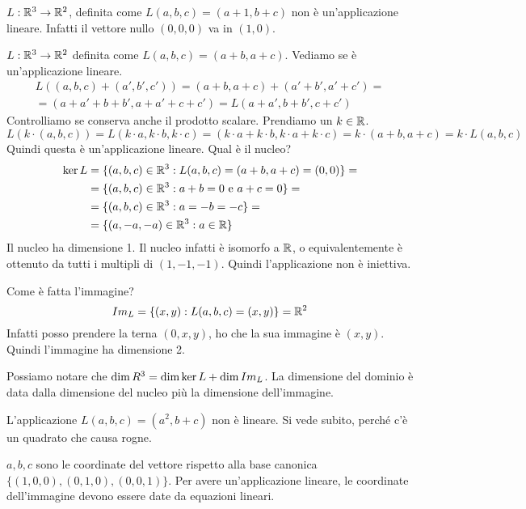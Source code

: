 \begin{exmp}
$L : \mathbb{R}^3 \to \mathbb{R}^2$, definita come $L(a,b,c) = (a+1, b+c)$ non \`e un'applicazione lineare. Infatti il vettore nullo $(0,0,0)$ va in $(1,0)$.

$L: \mathbb{R}^3 \to \mathbb{R}^2$ definita come $L(a,b,c) = (a + b, a + c)$. Vediamo se \`e un'applicazione lineare.
\begin{align*}
L \left( (a,b,c) + (a',b',c') \right) = (a+b,a+c) + (a' + b', a' + c') = \\ = (a + a' + b + b', a + a' + c + c') = L \left( a + a', b + b', c + c' \right)
\end{align*}
Controlliamo se conserva anche il prodotto scalare. Prendiamo un $k \in \mathbb{R}$.
\[
L \left( k \cdot (a,b,c) \right) = L \left( k \cdot a, k \cdot b, k \cdot c \right) = (k \cdot a + k \cdot b, k \cdot a + k \cdot c) = k \cdot (a + b, a + c) = k \cdot L(a, b, c)
\]
Quindi questa \`e un'applicazione lineare. Qual \`e il nucleo?
\begin{align*}
\ker L &= \{ (a,b,c) \in \mathbb{R}^3 : L(a,b,c) = (a + b, a +c) = (0, 0)\} = \\
&= \{ (a, b, c) \in \mathbb{R}^3 : a + b = 0 \text{ e } a + c = 0 \} = \\ 
&= \{ (a,b,c) \in \mathbb{R}^3 : a = -b = -c \} = \\
&= \{ (a, -a, -a) \in \mathbb{R}^3 : a \in \mathbb{R} \}
\end{align*}
Il nucleo ha dimensione 1. Il nucleo infatti \`e isomorfo a $\mathbb{R}$, o equivalentemente \`e ottenuto da tutti i multipli di $(1, -1, -1)$. Quindi l'applicazione non \`e iniettiva.

Come \`e fatta l'immagine?
\[
Im_{L} = \{ (x, y) : L(a,b,c) = (x,y) \} = \mathbb{R}^2
\]
Infatti posso prendere la terna $(0, x, y)$, ho che la sua immagine \`e $(x,y)$. Quindi l'immagine ha dimensione 2.

Possiamo notare che $\dim R^3 = \dim \ker L + \dim Im_{L}$. La dimensione del dominio \`e data dalla dimensione del nucleo pi\`u la dimensione dell'immagine.

L'applicazione $L(a,b,c) = (a^2, b+c)$ non \`e lineare. Si vede subito, perch\'e c'\`e un quadrato che causa rogne.

$a,b,c$ sono le coordinate del vettore rispetto alla base canonica $\{ (1, 0, 0), (0, 1, 0), (0, 0, 1) \}$. Per avere un'applicazione lineare, le coordinate dell'immagine devono essere date da equazioni lineari.


\end{exmp}
